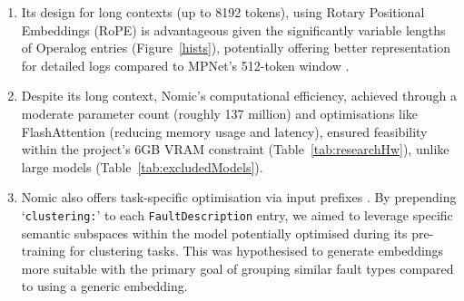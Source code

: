 \documentclass[10pt,oneside]{report}
\begin{document}
\begin{enumerate}
    
    \item Its design for long contexts (up to 8192 tokens), using Rotary Positional Embeddings (RoPE) \cite{su2024roformer} is advantageous given the significantly variable lengths of Operalog entries (Figure~\ref{hists}), potentially offering better representation for detailed logs compared to MPNet's 512-token window \cite{song2020mpnet}. 


    \item Despite its long context, Nomic's computational efficiency, achieved through a moderate parameter count (roughly 137 million) and optimisations like FlashAttention \cite{dao2022flashattention} (reducing memory usage and latency), ensured feasibility within the project's 6GB VRAM constraint (Table~\ref{tab:researchHw}), unlike large models (Table~\ref{tab:excludedModels}).

    \item Nomic also offers task-specific optimisation via input prefixes \cite{nussbaum2024nomic}. By prepending `\texttt{clustering:}' to each \texttt{FaultDescription} entry, we aimed to leverage specific semantic subspaces within the model potentially optimised during its pre-training for clustering tasks. This was hypothesised to generate embeddings more suitable with the primary goal of grouping similar fault types compared to using a generic embedding.


\end{enumerate}
\end{document}
